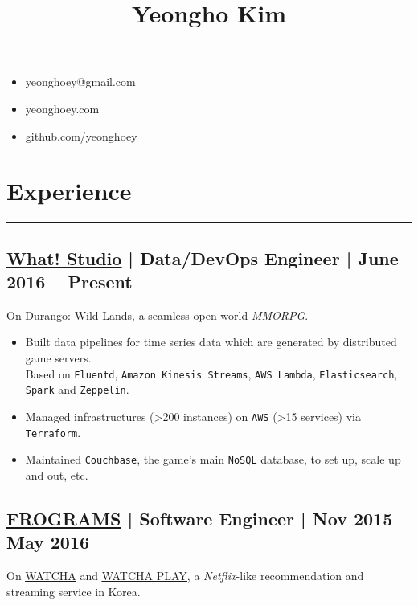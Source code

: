 \documentclass[11pt]{article}
\date{}
\title{Yeongho Kim}
\begin{document}
\maketitle
{}
\vspace{-22ex}

\begin{itemize}[itemindent=34.5em,label=\null,itemsep=-1ex]
\item yeonghoey@gmail.com
\item yeonghoey.com
\item github.com/yeonghoey
\end{itemize}

\vspace{-8ex}

\section*{Experience}
\label{sec:org994aff5}
\vspace{-4ex}

\noindent\rule{\textwidth}{0.5pt}
\vspace{-4ex}

\subsection*{\underline{\href{https://github.com/what-studio}{What! Studio}} | Data/DevOps Engineer | June 2016 – Present}
\label{sec:orgcb67fa9}
On \uline{\href{https://durango.nexon.com/en}{Durango: Wild Lands}}, a seamless open world \emph{MMORPG}.

\begin{itemize}[label=$\circ$,itemsep=-0.5ex]
\item Built data pipelines for time series data which are generated by distributed game servers.  \\
Based on \texttt{Fluentd}, \texttt{Amazon Kinesis Streams}, \texttt{AWS Lambda}, \texttt{Elasticsearch}, \texttt{Spark} and \texttt{Zeppelin}.
\item Managed infrastructures (>200 instances) on \texttt{AWS} (>15 services) via \texttt{Terraform}.
\item Maintained \texttt{Couchbase}, the game's main \texttt{NoSQL} database, to set up, scale up and out, etc.
\end{itemize}

\subsection*{\underline{\href{http://frograms.com}{FROGRAMS}} | Software Engineer  | Nov 2015 – May 2016}
\label{sec:org1b34987}
On \uline{\href{https://watcha.net/}{WATCHA}} and \uline{\href{https://play.watcha.net}{WATCHA PLAY}}, a \emph{Netflix}-like recommendation and streaming service in Korea.
\end{document}
